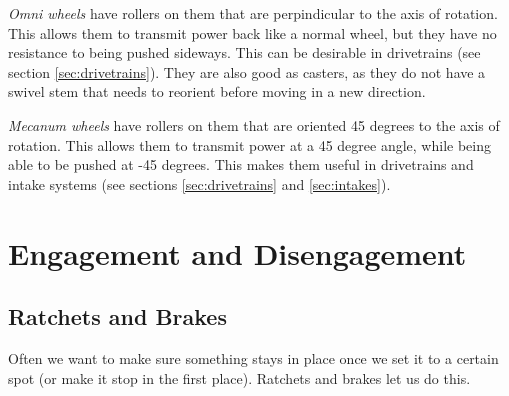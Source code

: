 	\begin{asparaenum}[a)]
		\item \textit{Omni wheels} have rollers on them that are perpindicular to the axis of rotation. This allows them to transmit power back like a normal wheel, but they have no resistance to being pushed sideways. This can be desirable in drivetrains (see section \ref{sec:drivetrains}). They are also good as casters, as they do not have a swivel stem that needs to reorient before moving in a new direction.
		\item \textit{Mecanum wheels} have rollers on them that are oriented 45 degrees to the axis of rotation. This allows them to transmit power at a 45 degree angle, while being able to be pushed at -45 degrees. This makes them useful in drivetrains and intake systems (see sections \ref{sec:drivetrains} and \ref{sec:intakes}).
	\end{asparaenum}

\newpage
\section{Engagement and Disengagement} \label{sec:disengagement}

\subsection{Ratchets and Brakes}

Often we want to make sure something stays in place once we set it to a certain spot (or make it stop in the first place). Ratchets and brakes let us do this.

